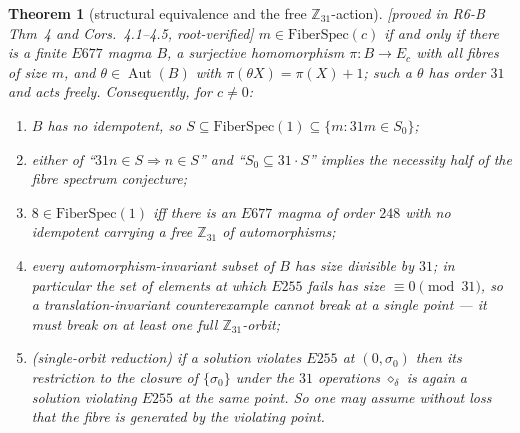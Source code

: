 \documentclass[11pt]{article}
\theoremstyle{plain}
\newtheorem{theorem}{Theorem}[section]
\theoremstyle{definition}
\theoremstyle{remark}
\numberwithin{equation}{section}
\newcommand{\Z}{\mathbb{Z}}
\newcommand{\Aut}{\operatorname{Aut}}
\newcommand{\statusbox}[1]{{\small\sloppy\textsf{[#1]}}}
\newcommand{\PROVED}[1]{\statusbox{proved in #1, root-verified}}
\begin{document}
\begin{theorem}[structural equivalence and the free $\Z_{31}$-action]\label{thm:fibrestruct}
\PROVED{R6-B Thm~4 and Cors.~4.1--4.5}
$m\in\mathrm{FiberSpec}(c)$ if and only if there is a finite $E677$ magma $B$, a
surjective homomorphism $\pi : B\to E_c$ with all fibres of size $m$, and
$\theta\in\Aut(B)$ with $\pi(\theta X) = \pi(X)+1$; such a $\theta$ has order $31$
and acts freely. Consequently, for $c\ne0$:
\begin{enumerate}
\item[(a)] $B$ has no idempotent, so $S\subseteq\mathrm{FiberSpec}(1)\subseteq\{m : 31m\in S_0\}$;
\item[(b)] either of ``$31n\in S\Rightarrow n\in S$'' and ``$S_0\subseteq31\cdot S$''
implies the necessity half of the fibre spectrum conjecture;
\item[(c)] $8\in\mathrm{FiberSpec}(1)$ iff there is an $E677$ magma of order
$248$ with no idempotent carrying a free $\Z_{31}$ of automorphisms;
\item[(d)] every automorphism-invariant subset of $B$ has size divisible by $31$;
in particular the set of elements at which $E255$ fails has size $\equiv0\pmod{31}$,
so a translation-invariant counterexample cannot break at a single point --- it
must break on at least one full $\Z_{31}$-orbit;
\item[(e)] (single-orbit reduction) if a solution violates $E255$ at $(0,\sigma_0)$
then its restriction to the closure of $\{\sigma_0\}$ under the $31$ operations
$\diamond_\delta$ is again a solution violating $E255$ at the same point. So one
may assume without loss that the fibre is generated by the violating point.
\end{enumerate}
\end{theorem}
\end{document}
